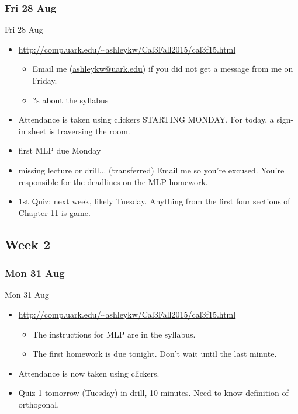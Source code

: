 \documentclass[12pt]{beamer}
\theoremstyle{plain}
\theoremstyle{definition}
\begin{document}
\subsubsection{Fri 28 Aug}
\begin{frame}{Fri 28 Aug}
\begin{itemize}
\item \url{http://comp.uark.edu/~ashleykw/Cal3Fall2015/cal3f15.html}
	\begin{itemize}
	\item Email me (\url{ashleykw@uark.edu}) if you did not get a message from me on Friday.
	\item ?s about the syllabus
	\end{itemize}
\item Attendance is taken using clickers STARTING MONDAY.  For today, a sign-in sheet is traversing the room.  
\end{itemize}
\end{frame}

\begin{frame}
\begin{itemize}
\item first MLP due Monday
\item missing lecture or drill... (transferred) Email me so you're excused.  You're responsible for the deadlines on the MLP homework.
\item 1st Quiz: next week, likely Tuesday.  Anything from the first four sections of Chapter 11 is game.
\end{itemize}
\end{frame}

\subsection{Week 2}
\subsubsection{Mon 31 Aug}
\begin{frame}{Mon 31 Aug}
\begin{itemize}
\item \url{http://comp.uark.edu/~ashleykw/Cal3Fall2015/cal3f15.html}
	\begin{itemize}
	\item The instructions for MLP are in the syllabus.
	\item The first homework is due tonight.  Don't wait until the last minute.
	\end{itemize}
\item Attendance is now taken using clickers. 
\item Quiz 1 tomorrow (Tuesday) in drill, 10 minutes.  Need to know definition of \alert{orthogonal}.
\end{itemize}
\end{frame}
\end{document}
